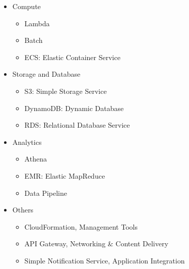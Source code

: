 \begin{itemize}
    \item Compute
    \begin{itemize}
        \item Lambda
        \item Batch
        \item ECS: Elastic Container Service
    \end{itemize}
    \item Storage and Database
    \begin{itemize}
        \item S3: Simple Storage Service
        \item DynamoDB: Dynamic Database
        \item RDS: Relational Database Service
    \end{itemize}
    \item Analytics
    \begin{itemize}
        \item Athena
        \item EMR: Elastic MapReduce
        \item Data Pipeline
    \end{itemize}
    \item Others
    \begin{itemize}
        \item CloudFormation, Management Tools
        \item API Gateway, Networking \& Content Delivery
        \item Simple Notification Service, Application Integration
    \end{itemize}
\end{itemize}



